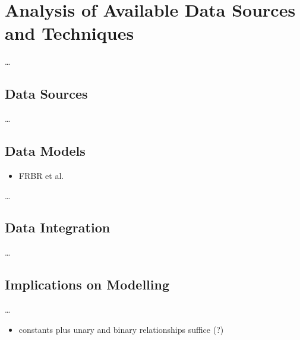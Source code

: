\chapter{Analysis of Available Data Sources and Techniques}
\label{chap:analysis}

\dots

\section{Data Sources}
\label{sec:data_sources}

\dots

\section{Data Models}
\label{sec:data_models}

\begin{itemize}
  \item
    FRBR et al.
\end{itemize}

\dots

\section{Data Integration}
\label{sec:data_integration}

\dots

\section{Implications on Modelling}
\label{sec:implications_on_modelling}

\dots

\begin{itemize}
  \item
    constants plus unary and binary relationships suffice (?)
\end{itemize}


